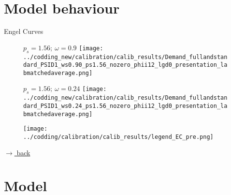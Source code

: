 \documentclass[11pt,aspectratio=169]{beamer}
\begin{document}
	\section{Model behaviour}
	\begin{frame}{Engel Curves}
		\hypertarget{engel}{}
		\begin{figure}[h!!]
			\centering
			\begin{minipage}[h!!]{0.39\textwidth}  
				\centering\textbf{ $p_s=1.56; \ \omega=0.9$ }
				\texttt{[image: ../codding\_new/calibration/calib\_results/Demand\_fullandstandard\_PSID1\_ws0.90\_ps1.56\_nozero\_phii12\_lgd0\_presentation\_labmatchedaverage.png]}
			\end{minipage}
			\begin{minipage}[h!!]{0.39\textwidth}  
				\centering\textbf{ $p_s=1.56;\ \omega=0.24$ }
				\texttt{[image: ../codding\_new/calibration/calib\_results/Demand\_fullandstandard\_PSID1\_ws0.24\_ps1.56\_nozero\_phii12\_lgd0\_presentation\_labmatchedaverage.png]}
			\end{minipage}
			\begin{minipage}[h!!]{0.03\textwidth}  
			\end{minipage}
			\begin{minipage}[h!!]{0.19\textwidth}  
				\texttt{[image: ../codding/calibration/calib\_results/legend\_EC\_pre.png]}
			\end{minipage}
		\end{figure}
		
		
		\hfill 
		\hyperlink{backengel}{\tiny{$\rightarrow$ back}}
	\end{frame}

\section{Model}
\end{document}
